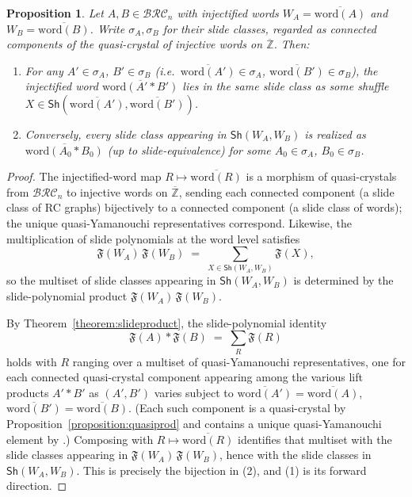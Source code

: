 \documentclass[a4paper,fleqn]{cas-sc}
\newtheorem{proposition}[lemma]{Proposition}
\theoremstyle{definition}
\theoremstyle{remark}
\numberwithin{equation}{subsection}
\newcommand{\BRC}{\mathcal{BRC}}
\begin{document}
\begin{proposition}\label{proposition:liftshufflewords}
Let $A, B\in\BRC_n$ with injectified words $W_A=\overline{\mathrm{word}(A)}$ and $W_B=\overline{\mathrm{word}(B)}$. Write $\sigma_A,\sigma_B$ for their slide classes, regarded as connected components of the quasi-crystal of injective words on $\overline{\mathbb{Z}}$. Then:
\begin{enumerate}
\item For any $A'\in\sigma_A$, $B'\in\sigma_B$ (i.e.\ $\overline{\mathrm{word}(A')}\in\sigma_A$, $\overline{\mathrm{word}(B')}\in\sigma_B$), the injectified word $\overline{\mathrm{word}(A'*B')}$ lies in the same slide class as some shuffle $X\in\mathsf{Sh}(\overline{\mathrm{word}(A')},\overline{\mathrm{word}(B')})$.
\item Conversely, every slide class appearing in $\mathsf{Sh}(W_A,W_B)$ is realized as $\overline{\mathrm{word}(A_0*B_0)}$ (up to slide-equivalence) for some $A_0\in\sigma_A$, $B_0\in\sigma_B$.
\end{enumerate}
\end{proposition}
\begin{proof}

The injectified-word map $R\mapsto\overline{\mathrm{word}(R)}$ is a morphism of quasi-crystals from $\BRC_n$ to injective words on $\overline{\mathbb{Z}}$, sending each connected component (a slide class of RC graphs) bijectively to a connected component (a slide class of words); the unique quasi-Yamanouchi representatives correspond. Likewise, the multiplication of slide polynomials at the word level satisfies
\[
\mathfrak{F}(W_A)\,\mathfrak{F}(W_B)\;=\;\sum_{X\in\mathsf{Sh}(W_A,W_B)}\mathfrak{F}(X),
\]
so the multiset of slide classes appearing in $\mathsf{Sh}(W_A,W_B)$ is determined by the slide-polynomial product $\mathfrak{F}(W_A)\,\mathfrak{F}(W_B)$.

By Theorem~\ref{theorem:slideproduct}, the slide-polynomial identity
\[
\mathfrak{F}(A)*\mathfrak{F}(B)\;=\;\sum_{R}\mathfrak{F}(R)
\]
holds with $R$ ranging over a multiset of quasi-Yamanouchi representatives, one for each connected quasi-crystal component appearing among the various lift products $A'*B'$ as $(A',B')$ varies subject to $\overline{\mathrm{word}(A')}=\overline{\mathrm{word}(A)}$, $\overline{\mathrm{word}(B')}=\overline{\mathrm{word}(B)}$. (Each such component is a quasi-crystal by Proposition~\ref{proposition:quasiprod} and contains a unique quasi-Yamanouchi element by \cite[Proposition~4.6]{cain2023quasicrystals}.) Composing with $R\mapsto\overline{\mathrm{word}(R)}$ identifies that multiset with the slide classes appearing in $\mathfrak{F}(W_A)\,\mathfrak{F}(W_B)$, hence with the slide classes in $\mathsf{Sh}(W_A,W_B)$. This is precisely the bijection in (2), and (1) is its forward direction.
\end{proof}
\end{document}
